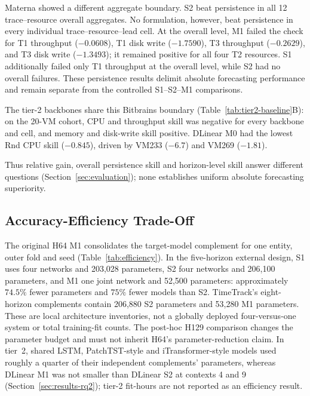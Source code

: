 \documentclass[5p,twocolumn]{elsarticle}
\begin{document}
Materna showed a different aggregate boundary. S2 beat persistence in all 12
trace--resource overall aggregates. No formulation, however, beat persistence
in every individual trace--resource--lead cell. At the overall level, M1 failed
the check for T1 throughput ($-0.0608$), T1 disk write ($-1.7590$), T3
throughput ($-0.2629$), and T3 disk write ($-1.3493$); it remained positive for
all four T2 resources. S1 additionally failed only T1 throughput at the overall
level, while S2 had no overall failures. These persistence results delimit
absolute forecasting performance and remain separate from the controlled
S1--S2--M1 comparisons.

The tier-2 backbones share this Bitbrains boundary
(Table~\ref{tab:tier2-baseline}B): on the 20-VM cohort, CPU and throughput
skill was negative for every backbone and cell, and memory and disk-write
skill positive. DLinear M0 had the lowest Rnd CPU skill ($-0.845$), driven
by VM233 ($-6.7$) and VM269 ($-1.81$).

Thus relative gain, overall persistence skill and horizon-level skill answer
different questions (Section~\ref{sec:evaluation}); none establishes uniform
absolute forecasting superiority.

\subsection{Accuracy-Efficiency Trade-Off}
\label{sec:results-efficiency}

The original H64 M1 consolidates the target-model complement for one entity,
outer fold and seed (Table~\ref{tab:efficiency}). In the five-horizon external design, S1 uses four
networks and 203,028 parameters, S2 four networks and 206,100 parameters, and
M1 one joint network and 52,500 parameters: approximately $74.5\%$ fewer
parameters and $75\%$ fewer models than S2. TimeTrack's eight-horizon
complements contain 206,880 S2 parameters and 53,280 M1 parameters. These
are local architecture inventories, not a globally deployed four-versus-one
system or total training-fit counts. The post-hoc H129 comparison changes
the parameter budget and must not inherit H64's parameter-reduction claim.
In tier~2, shared LSTM, PatchTST-style and iTransformer-style models used
roughly a quarter of their independent complements' parameters, whereas
DLinear M1 was not smaller than DLinear S2 at contexts 4 and 9
(Section~\ref{sec:results-rq2}); tier-2 fit-hours are not reported as an
efficiency result.
\end{document}
